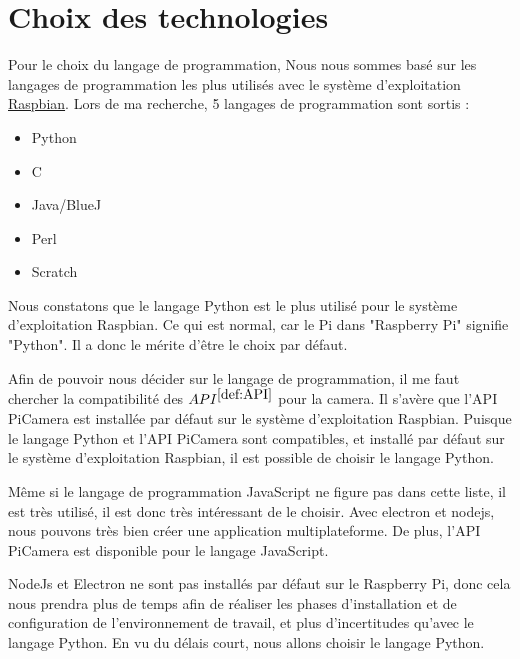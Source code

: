     \section{Choix des technologies}
        Pour le choix du langage de programmation, Nous nous sommes basé sur les langages de programmation les plus utilisés avec le système d'exploitation \underline{Raspbian}. Lors de ma recherche, 5 langages de programmation sont sortis : 

        \begin{itemize}
            \item Python
            \item C
            \item Java/BlueJ
            \item Perl
            \item Scratch
        \end{itemize}

        Nous constatons que le langage Python est le plus utilisé pour le système d'exploitation Raspbian. Ce qui est normal, car le Pi dans "Raspberry Pi" signifie "Python". Il a donc le mérite d'être le choix par défaut.

        \vspace{0.2cm}

        Afin de pouvoir nous décider sur le langage de programmation, il me faut chercher la compatibilité des \underline{$API^{\ref{def:API}}$} pour la camera. Il s'avère que l'API PiCamera est installée par défaut sur le système d'exploitation Raspbian. Puisque le langage Python et l'API PiCamera sont compatibles, et installé par défaut sur le système d'exploitation Raspbian, il est possible de choisir le langage Python.

        \vspace{0.2cm}
    
        Même si le langage de programmation JavaScript ne figure pas dans cette liste, il est très utilisé, il est donc très intéressant de le choisir.
        Avec electron et nodejs, nous pouvons très bien créer une application multiplateforme. De plus, l'API PiCamera est disponible pour le langage JavaScript.    

        NodeJs et Electron ne sont pas installés par défaut sur le Raspberry Pi, donc cela nous prendra plus de temps afin de réaliser les phases d'installation et de configuration de l'environnement de travail, et plus d'incertitudes qu'avec le langage Python. En vu du délais court, nous allons choisir le langage Python.

